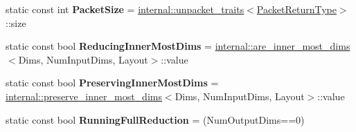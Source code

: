 \begin{DoxyCompactItemize}
static const int {\bfseries Packet\+Size} = \hyperlink{struct_eigen_1_1internal_1_1unpacket__traits}{internal\+::unpacket\+\_\+traits}$<$\hyperlink{group___sparse_core___module}{Packet\+Return\+Type}$>$\+::size
\item 
\mbox{\label{struct_eigen_1_1_tensor_evaluator_3_01const_01_tensor_reduction_op_3_01_op_00_01_dims_00_01_arg_4fdf2ec1445de4704eb590bc98040dc6_a780db50c6d095b2f0cd680f4c97c5bf4}} 
static const bool {\bfseries Reducing\+Inner\+Most\+Dims} = \hyperlink{struct_eigen_1_1internal_1_1are__inner__most__dims}{internal\+::are\+\_\+inner\+\_\+most\+\_\+dims}$<$Dims, Num\+Input\+Dims, Layout$>$\+::value
\item 
\mbox{\label{struct_eigen_1_1_tensor_evaluator_3_01const_01_tensor_reduction_op_3_01_op_00_01_dims_00_01_arg_4fdf2ec1445de4704eb590bc98040dc6_a94a8a92cc9d983b8ba324cacba65c1ec}} 
static const bool {\bfseries Preserving\+Inner\+Most\+Dims} = \hyperlink{struct_eigen_1_1internal_1_1preserve__inner__most__dims}{internal\+::preserve\+\_\+inner\+\_\+most\+\_\+dims}$<$Dims, Num\+Input\+Dims, Layout$>$\+::value
\item 
\mbox{\label{struct_eigen_1_1_tensor_evaluator_3_01const_01_tensor_reduction_op_3_01_op_00_01_dims_00_01_arg_4fdf2ec1445de4704eb590bc98040dc6_a99509c62d37e37299aab79fa3ce77828}} 
static const bool {\bfseries Running\+Full\+Reduction} = (Num\+Output\+Dims==0)
\end{DoxyCompactItemize}
